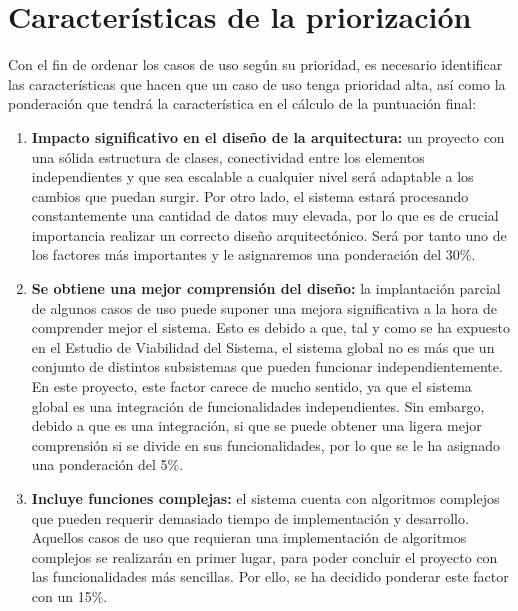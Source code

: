 \section{Características de la priorización}

\par Con el fin de ordenar los casos de uso según su prioridad, es necesario identificar las características que hacen que un caso de uso tenga prioridad alta, así como la ponderación que tendrá la característica en el cálculo de la puntuación final:

\begin{enumerate}

\item \textbf{Impacto significativo en el diseño de la arquitectura:} un proyecto con una sólida estructura de clases, conectividad entre los elementos independientes y que sea escalable a cualquier nivel será adaptable a los cambios que puedan surgir. Por otro lado, el sistema estará procesando constantemente una cantidad de datos muy elevada, por lo que es de crucial importancia realizar un correcto diseño arquitectónico. Será por tanto uno de los factores más importantes y le asignaremos una ponderación del 30\%.

\item \textbf{Se obtiene una mejor comprensión del diseño:} la implantación parcial de algunos casos de uso puede suponer una mejora significativa a la hora de comprender mejor el sistema. Esto es debido a que, tal y como se ha expuesto en el Estudio de Viabilidad del Sistema, el sistema global no es más que un conjunto de distintos subsistemas que pueden funcionar independientemente. En este proyecto, este factor carece de mucho sentido, ya que el sistema global es una integración de funcionalidades independientes. Sin embargo, debido a que es una integración, si que se puede obtener una ligera mejor comprensión si se divide en sus funcionalidades, por lo que se le ha asignado una ponderación del 5\%.

\item \textbf{Incluye funciones complejas:} el sistema cuenta con algoritmos complejos que pueden requerir demasiado tiempo de implementación y desarrollo. Aquellos casos de uso que requieran una implementación de algoritmos complejos se realizarán en primer lugar, para poder concluir el proyecto con las funcionalidades más sencillas. Por ello, se ha decidido ponderar este factor con un 15\%.


\end{enumerate}
